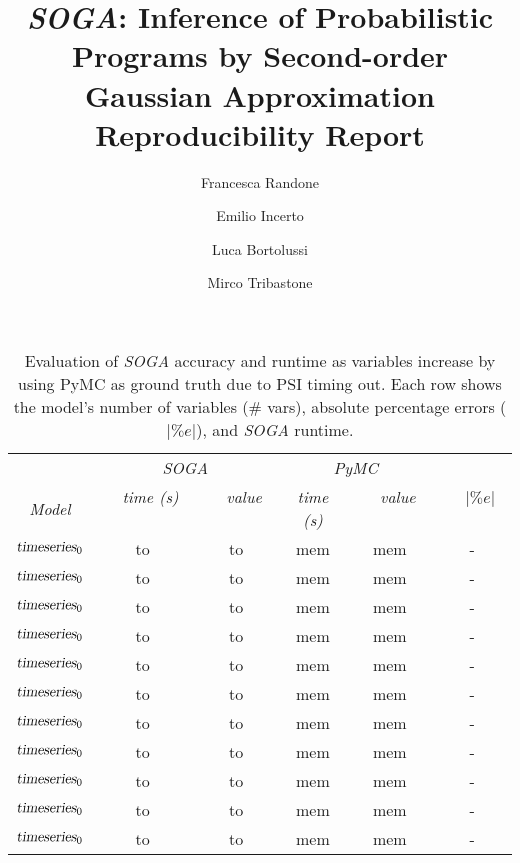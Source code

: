 \documentclass[a4paper]{llncs}
\newcommand{\soga}{\textsl{SOGA}}
\begin{document}
\mainmatter

\title{\soga: Inference of Probabilistic Programs by Second-order Gaussian Approximation Reproducibility Report}


\author{Francesca Randone  \and Emilio Incerto  \and Luca Bortolussi  \and Mirco Tribastone}

\allowdisplaybreaks[0]

\maketitle
\setcounter{table}{1}
\begin{table}[t]
    \centering
    \caption{Evaluation of \soga{} accuracy and runtime as variables increase by using PyMC as ground truth due to PSI timing out. Each row shows the model's number of variables (\# vars), absolute percentage errors ($|\%e|$), and \soga{} runtime.} 
     \begin{tabular}{cccccc}
     \toprule 
        &\multicolumn{2}{c}{\emph{SOGA}}&\multicolumn{2}{c}{\emph{PyMC}}\\
        \cmidrule(l){2-3}  \cmidrule(l){4-5}
        \emph{Model}&
    \ \ \emph{time (s)}  \ \ &  \ \  \emph{value} \ \ & \emph{time (s)} 
    & \ \  \emph{value} \ \  &\ \  $|\%e|$ \ \  \\
    \midrule
        $\textsl{timeseries}_{0}$ & to & to & mem & mem &- \\
        $\textsl{timeseries}_{0}$ & to & to & mem & mem &- \\
        $\textsl{timeseries}_{0}$ & to & to & mem & mem &- \\
        $\textsl{timeseries}_{0}$ & to & to & mem & mem &- \\
        $\textsl{timeseries}_{0}$ & to & to & mem & mem &- \\
        $\textsl{timeseries}_{0}$ & to & to & mem & mem &- \\
        $\textsl{timeseries}_{0}$ & to & to & mem & mem &- \\
        $\textsl{timeseries}_{0}$ & to & to & mem & mem &- \\
        $\textsl{timeseries}_{0}$ & to & to & mem & mem &- \\
        $\textsl{timeseries}_{0}$ & to & to & mem & mem &- \\
        $\textsl{timeseries}_{0}$ & to & to & mem & mem &- \\
    \bottomrule
    \end{tabular}
    \label{tab:sensVar}
\end{table}
\end{document}

